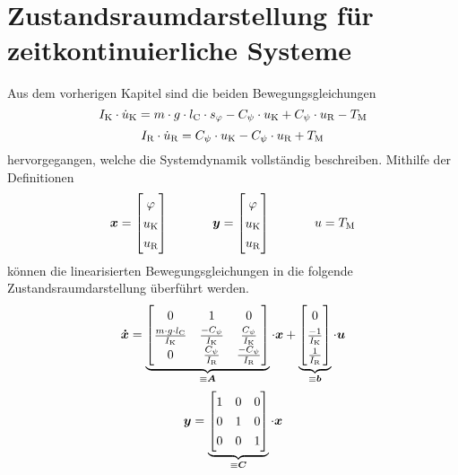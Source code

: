 \section{Zustandsraumdarstellung für zeitkontinuierliche Systeme}
Aus dem vorherigen Kapitel sind die beiden Bewegungsgleichungen 
\begin{equation}
I_{\text{K}} \cdot \dot{u}_{\text{K}} = m\cdot g\cdot l_{\text{C}}\cdot s_{\varphi} - C_{\psi}\cdot u_{\text{K}} + C_{\psi} \cdot u_{\text{R}} - T_{\text{M}}
\end{equation}
\begin{equation}
I_{\text{R}}\cdot \dot{u}_{\text{R}} = C_{\psi}\cdot u_{\text{K}} - C_{\psi}\cdot u_{\text{R}} + T_{\text{M}}
\end{equation}
hervorgegangen, welche die Systemdynamik vollständig beschreiben. Mithilfe der Definitionen
\begin{equation}
\bs{x} = \begin{bmatrix} \varphi \\ u\idx{K} \\ u\idx{R} \end{bmatrix}
\hspace{35pt}
\bs{y} = \begin{bmatrix} \varphi \\ u\idx{K} \\ u\idx{R} \end{bmatrix}
\hspace{35pt}
u = T\idx{M}
\end{equation}
können die linearisierten Bewegungsgleichungen in die folgende Zustandsraumdarstellung überführt werden.
\begin{equation}
\renewcommand*{\arraystretch}{1.3}
\bs{\dot{x}} = \underbrace{\begin{bmatrix}
0 & 1 & 0 
\\ 
\frac{m\cdot g\cdot l\idx{C}}{I\idx{K}} & \frac{-C_{\psi}}{I\idx{K}} & \frac{C_{\psi}}{I\idx{K}}
\\ 
0 & \frac{C_{\psi}}{I\idx{R}} & \frac{-C_{\psi}}{I\idx{R}}
\end{bmatrix}}_{\equiv \bs{A}} \cdot \bs{x}
+
\underbrace{\begin{bmatrix}
0 \\ \frac{-1}{I\idx{K}} \\ \frac{1}{I\idx{R}}
\end{bmatrix}}_{\equiv \bs{b}} \cdot \bs{u}
\end{equation}
\begin{equation}
\bs{y} = \underbrace{\begin{bmatrix}
1 & 0 & 0 \\ 0 & 1 & 0 \\ 0 & 0 & 1
\end{bmatrix}}_{\equiv \bs{C}} \cdot \bs{x}
\end{equation}
